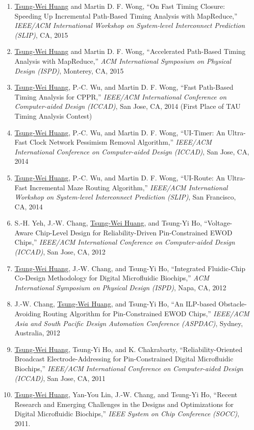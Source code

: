 \documentclass[A4,11pt]{article}
\begin{document}
\begin{enumerate}
    \item \underline{Tsung-Wei Huang} and Martin D. F. Wong, ``On Fast Timing Closure: Speeding Up Incremental Path-Based Timing Analysis with MapReduce,'' \textit{IEEE/ACM International Workshop on System-level Interconnect Prediction (SLIP)}, CA, 2015
    \item \underline{Tsung-Wei Huang} and Martin D. F. Wong, ``Accelerated Path-Based Timing Analysis with MapReduce,'' \textit{ACM International Symposium on Physical Design (ISPD)}, Monterey, CA, 2015
    \item \underline{Tsung-Wei Huang}, P.-C. Wu, and Martin D. F. Wong, ``Fast Path-Based Timing Analysis for CPPR,'' \textit{IEEE/ACM International Conference on Computer-aided Design (ICCAD)}, San Jose, CA, 2014 (First Place of TAU Timing Analysis Contest)
    \item \underline{Tsung-Wei Huang}, P.-C. Wu, and Martin D. F. Wong, ``UI-Timer: An Ultra-Fast Clock Network Pessimism Removal Algorithm,'' \textit{IEEE/ACM International Conference on Computer-aided Design (ICCAD)}, San Jose, CA, 2014 
    \item \underline{Tsung-Wei Huang}, P.-C. Wu, and Martin D. F. Wong, ``UI-Route: An Ultra-Fast Incremental Maze Routing Algorithm,'' \textit{IEEE/ACM International Workshop on System-level Interconnect Prediction (SLIP)}, San Francisco, CA, 2014
    \item S.-H. Yeh, J.-W. Chang, \underline{Tsung-Wei Huang}, and Tsung-Yi Ho, ``Voltage-Aware Chip-Level Design for Reliability-Driven Pin-Constrained EWOD Chips,'' \textit{IEEE/ACM International Conference on Computer-aided Design (ICCAD)}, San Jose, CA, 2012
    \item \underline{Tsung-Wei Huang}, J.-W. Chang, and Tsung-Yi Ho, ``Integrated Fluidic-Chip Co-Design Methodology for Digital Microfluidic Biochips,'' \textit{ACM International Symposium on Physical Design (ISPD)}, Napa, CA, 2012
    \item J.-W. Chang, \underline{Tsung-Wei Huang}, and Tsung-Yi Ho, ``An ILP-based Obstacle-Avoiding Routing Algorithm for Pin-Constrained EWOD Chips,'' \textit{IEEE/ACM Asia and South Pacific Design Automation Conference (ASPDAC)}, Sydney, Australia, 2012
    \item \underline{Tsung-Wei Huang}, Tsung-Yi Ho, and K. Chakrabarty, ``Reliability-Oriented Broadcast Electrode-Addressing for Pin-Constrained Digital Microfluidic Biochips,'' \textit{IEEE/ACM International Conference on Computer-aided Design (ICCAD)}, San Jose, CA, 2011
    \item \underline{Tsung-Wei Huang}, Yan-You Lin, J.-W. Chang, and Tsung-Yi Ho, ``Recent Research and Emerging Challenges in the Designs and Optimizations for Digital Microfluidic Biochips,'' \textit{IEEE System on Chip Conference (SOCC)}, 2011. 

\end{enumerate}
\end{document}

